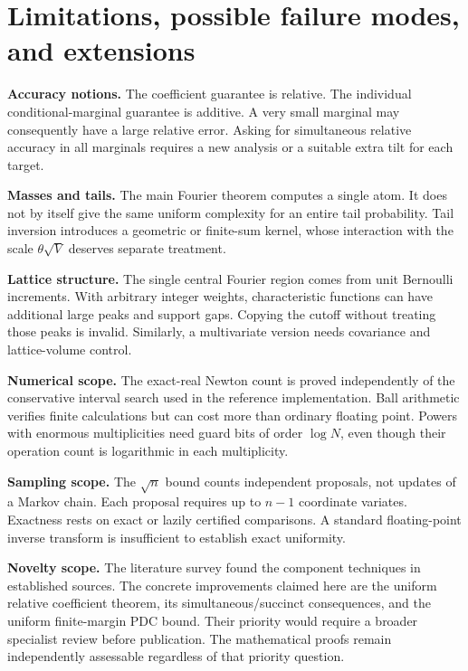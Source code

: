 \documentclass[11pt,a4paper]{article}
\theoremstyle{definition}
\begin{document}
\section{Limitations, possible failure modes, and extensions}\label{sec:limits}

\textbf{Accuracy notions.} The coefficient guarantee is relative. The individual conditional-marginal guarantee is additive. A very small marginal may consequently have a large relative error. Asking for simultaneous relative accuracy in all marginals requires a new analysis or a suitable extra tilt for each target.

\textbf{Masses and tails.} The main Fourier theorem computes a single atom. It does not by itself give the same uniform complexity for an entire tail probability. Tail inversion introduces a geometric or finite-sum kernel, whose interaction with the scale $\theta\sqrt V$ deserves separate treatment.

\textbf{Lattice structure.} The single central Fourier region comes from unit Bernoulli increments. With arbitrary integer weights, characteristic functions can have additional large peaks and support gaps. Copying the cutoff without treating those peaks is invalid. Similarly, a multivariate version needs covariance and lattice-volume control.

\textbf{Numerical scope.} The exact-real Newton count is proved independently of the conservative interval search used in the reference implementation. Ball arithmetic verifies finite calculations but can cost more than ordinary floating point. Powers with enormous multiplicities need guard bits of order $\log N$, even though their operation count is logarithmic in each multiplicity.

\textbf{Sampling scope.} The $\sqrt n$ bound counts independent proposals, not updates of a Markov chain. Each proposal requires up to $n-1$ coordinate variates. Exactness rests on exact or lazily certified comparisons. A standard floating-point inverse transform is insufficient to establish exact uniformity.

\textbf{Novelty scope.} The literature survey found the component techniques in established sources. The concrete improvements claimed here are the uniform relative coefficient theorem, its simultaneous/succinct consequences, and the uniform finite-margin PDC bound. Their priority would require a broader specialist review before publication. The mathematical proofs remain independently assessable regardless of that priority question.
\end{document}
